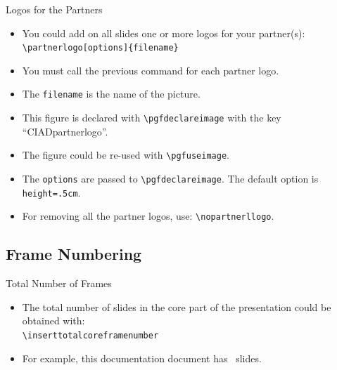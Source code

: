 \documentclass[english,sectioncirclenumberstyle]{ciadbeamer}
\begin{document}
\begin{frame}{Logos for the Partners}
	\begin{itemize}
	\item You could add on all slides one or more logos for your partner(s): \\
		\texttt{{\textbackslash}partnerlogo[options]\{filename\}}
	\item You must call the previous command for each partner logo.
	\item The \texttt{filename} is the name of the picture.
	\vspace{1em}
	\item This figure is declared with \texttt{{\textbackslash}pgfdeclareimage} with the key ``CIADpartnerlogo''.
	\item The figure could be re-used with \texttt{{\textbackslash}pgfuseimage}.
	\item The \texttt{options} are passed to \texttt{{\textbackslash}pgfdeclareimage}. The default option is \texttt{height=.5cm}.
	\item For removing all the partner logos, use: \texttt{{\textbackslash}nopartnerllogo}.
	\end{itemize}
\end{frame}


\subsection{Frame Numbering}

\begin{frame}{Total Number of Frames}
	\begin{itemize}
	\item The total number of slides in the core part of the presentation could be obtained with: \\
		\texttt{{\textbackslash}inserttotalcoreframenumber}
	\item For example, this documentation document has \inserttotalcoreframenumber\ slides.
	\end{itemize}
\end{frame}
\end{document}
